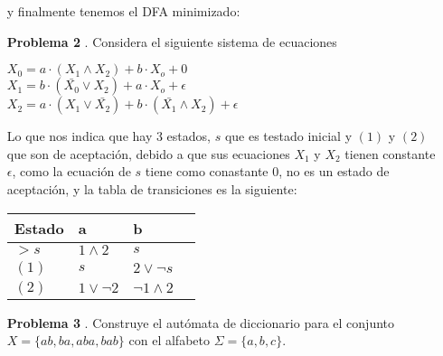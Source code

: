 \documentclass{article}
\begin{document}
\begin{enumerate}
y finalmente tenemos el DFA minimizado:



\item[\bf{Problema 2}].  Considera el siguiente sistema de ecuaciones


$ X_0 = a \cdot (X_1 \wedge X_2) + b \cdot X_o +0 $\\
$ X_1 = b \cdot (\bar{X_0} \vee X_2) + a \cdot X_o + \epsilon $\\
$ X_2 = a \cdot (X_1 \vee \bar{X_2}) + b \cdot (\bar{X_1} \wedge X_2) + \epsilon$

Lo que nos indica que hay 3 estados, $s$ que es testado inicial
y $(1)$ y $(2)$ que son de aceptación, debido a que sus ecuaciones $X_1$ y $X_2$ tienen constante $\epsilon$, como la ecuación de $s$ tiene como conastante $0$, no es un estado de aceptación, y la tabla de transiciones es la siguiente:

\begin{tabular}{ | l || l | l | l  |}
  \hline
Estado    &  a    &   b  \\
  \hline
$>s$   &   $1 \wedge 2$  &  $ s $   \\    
$(1)$  &   $ s $  &  $ 2  \vee \neg s$   \\
$(2)$  &   $ 1 \vee \neg 2$    &  $\neg 1 \wedge 2 $ \\
  \hline  
\end{tabular}


\item[\bf{Problema 3}]. Construye el autómata de diccionario para el conjunto $X = \{ab, ba, aba, bab\}$ con el alfabeto $\Sigma = \{a, b, c\}$.



\end{enumerate}
\end{document}
